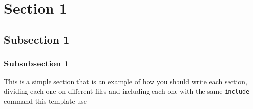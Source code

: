 \section{Section 1}
\subsection{Subsection 1}
\subsubsection{Subsubsection 1}

This is a simple section that is an example of how you should write each
section, dividing each one on different files and including each one with the
same \texttt{include} command this template use
